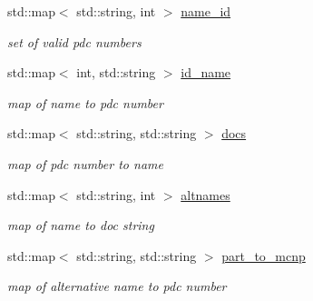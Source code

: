 \begin{DoxyCompactItemize}
\mbox{\label{namespacepyne_1_1particle_a649721d363b978995fb05f8007e4ecfb}} 
std\+::map$<$ std\+::string, int $>$ \hyperlink{namespacepyne_1_1particle_a649721d363b978995fb05f8007e4ecfb}{name\+\_\+id}
\begin{DoxyCompactList}\small\item\em set of valid pdc numbers \end{DoxyCompactList}\item 
\mbox{\label{namespacepyne_1_1particle_adfacb4f56580ef9aa94b6cf6970ac366}} 
std\+::map$<$ int, std\+::string $>$ \hyperlink{namespacepyne_1_1particle_adfacb4f56580ef9aa94b6cf6970ac366}{id\+\_\+name}
\begin{DoxyCompactList}\small\item\em map of name to pdc number \end{DoxyCompactList}\item 
\mbox{\label{namespacepyne_1_1particle_a1134f614fd50d48b1583634857ebc775}} 
std\+::map$<$ std\+::string, std\+::string $>$ \hyperlink{namespacepyne_1_1particle_a1134f614fd50d48b1583634857ebc775}{docs}
\begin{DoxyCompactList}\small\item\em map of pdc number to name \end{DoxyCompactList}\item 
\mbox{\label{namespacepyne_1_1particle_a848d7127667430bd7fa3896ea4145639}} 
std\+::map$<$ std\+::string, int $>$ \hyperlink{namespacepyne_1_1particle_a848d7127667430bd7fa3896ea4145639}{altnames}
\begin{DoxyCompactList}\small\item\em map of name to doc string \end{DoxyCompactList}\item 
\mbox{\label{namespacepyne_1_1particle_ab46830f83783c4230c4d30a290d8c5fc}} 
std\+::map$<$ std\+::string, std\+::string $>$ \hyperlink{namespacepyne_1_1particle_ab46830f83783c4230c4d30a290d8c5fc}{part\+\_\+to\+\_\+mcnp}
\begin{DoxyCompactList}\small\item\em map of alternative name to pdc number \end{DoxyCompactList}\item 

\end{DoxyCompactItemize}
